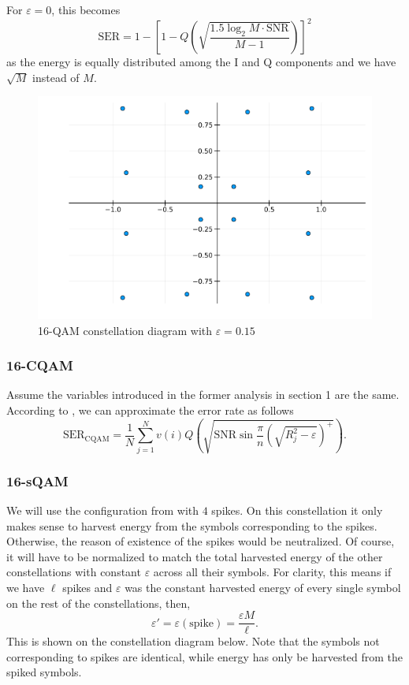 \documentclass[11pt,a4paper,onecolumn,final]{article}
\newcommand{\eps}{\varepsilon}
\begin{document}
For \(\eps = 0\), this becomes
\begin{equation}
    \text{SER} = 1 - \left[1 - Q\left(\sqrt{\frac{1.5\log_2 M \cdot \text{SNR}}{M - 1}}\right)\right]^2
\end{equation}
as the energy is equally distributed among the I and Q components and we have \(\sqrt{M}\) instead of \(M\). 
\begin{figure}[h]
    \centering
    \includegraphics[scale=0.6]{16qam_e015.png}
    \caption{16-QAM constellation diagram with \(\eps = 0.15\)}
\end{figure}

\subsubsection*{16-CQAM}
Assume the variables introduced in the former analysis in section 1 are the same. According to \cite{cqam}, we can approximate the error rate as follows
\begin{equation}
    \text{SER}_\text{CQAM} = \frac{1}{N} \sum_{j = 1}^{N }v(i)Q\left(\sqrt{\text{SNR} \sin \frac{\pi}{n}\left(\sqrt{R_j^2 - \eps }\right)^+}\right). 
\end{equation}

\subsubsection*{16-sQAM}
We will use the configuration from \cite{sqam} with \(4\) spikes. On this constellation it only makes sense to harvest energy from the symbols corresponding to the spikes. Otherwise, the reason of existence of the spikes would be neutralized. Of course, it will have to be normalized to match the total harvested energy of the other constellations with constant \(\eps \) across all their symbols. For clarity, this means if we have \(\ell\) spikes and \(\eps \) was the constant harvested energy of every single symbol on the rest of the constellations, then, 
\begin{equation}
    \eps ' = \eps(\text{spike}) = \frac{\eps M }{\ell}. 
\end{equation}
This is shown on the constellation diagram below. Note that the symbols not corresponding to spikes are identical, while energy has only be harvested from the spiked symbols. 
\end{document}
